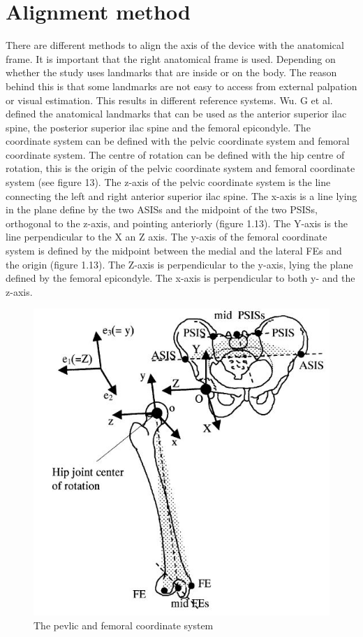\documentclass[whitelogo]{tudelft-report}
\begin{document}
{\section{Alignment method}
There are different methods to align the axis of the device with the anatomical frame. It is important that the right anatomical frame is used. Depending on whether the study uses landmarks that are inside or on the body. The reason behind this is that some landmarks are not easy to access from external palpation or visual estimation. This results in different reference systems. Wu. G et al.~\cite{wu2002isb} defined the anatomical landmarks that can be used as the anterior superior ilac spine, the posterior superior ilac spine and the femoral epicondyle. The coordinate system can be defined with the pelvic coordinate system and femoral coordinate system. The centre of rotation can be defined with the hip centre of rotation, this is the origin of the pelvic coordinate system and femoral coordinate system (see figure 13). The z-axis of the pelvic coordinate system is the line connecting the left and right anterior superior ilac spine. The x-axis is a line lying in the plane define by the two ASISs and the midpoint of the two PSISs, orthogonal to the z-axis, and pointing anteriorly (figure 1.13). The Y-axis is the line perpendicular to the X an Z axis. The y-axis of the femoral coordinate system is defined by the midpoint between the medial and the lateral FEs and the origin (figure 1.13). The Z-axis is perpendicular to the y-axis, lying the plane defined by the femoral epicondyle. The x-axis is perpendicular to both y- and the z-axis.
\begin{figure}[!htb]
	\centering\includegraphics[width=0.5\linewidth]{coordinate_system_hip.JPG}
	\caption{\label{fig:fig1}The pevlic and femoral coordinate system~\cite{wu2002isb}}
\end{figure}%

}
\end{document}
